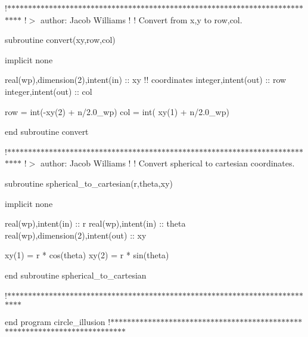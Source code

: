  !$\ast$$\ast$$\ast$$\ast$$\ast$$\ast$$\ast$$\ast$$\ast$$\ast$$\ast$$\ast$$\ast$$\ast$$\ast$$\ast$$\ast$$\ast$$\ast$$\ast$$\ast$$\ast$$\ast$$\ast$$\ast$$\ast$$\ast$$\ast$$\ast$$\ast$$\ast$$\ast$$\ast$$\ast$$\ast$$\ast$$\ast$$\ast$$\ast$$\ast$$\ast$$\ast$$\ast$$\ast$$\ast$$\ast$$\ast$$\ast$$\ast$$\ast$$\ast$$\ast$$\ast$$\ast$$\ast$$\ast$$\ast$$\ast$$\ast$$\ast$$\ast$$\ast$$\ast$$\ast$$\ast$$\ast$$\ast$$\ast$$\ast$$\ast$$\ast$$\ast$$\ast$$\ast$$\ast$ !$>$ author\+: Jacob Williams ! ! Convert from x,y to row,col. \begin{DoxyVerb}subroutine convert(xy,row,col)

implicit none

real(wp),dimension(2),intent(in) :: xy  !! coordinates
integer,intent(out) :: row
integer,intent(out) :: col

row = int(-xy(2) + n/2.0_wp)
col = int( xy(1) + n/2.0_wp)

end subroutine convert
\end{DoxyVerb}
 !$\ast$$\ast$$\ast$$\ast$$\ast$$\ast$$\ast$$\ast$$\ast$$\ast$$\ast$$\ast$$\ast$$\ast$$\ast$$\ast$$\ast$$\ast$$\ast$$\ast$$\ast$$\ast$$\ast$$\ast$$\ast$$\ast$$\ast$$\ast$$\ast$$\ast$$\ast$$\ast$$\ast$$\ast$$\ast$$\ast$$\ast$$\ast$$\ast$$\ast$$\ast$$\ast$$\ast$$\ast$$\ast$$\ast$$\ast$$\ast$$\ast$$\ast$$\ast$$\ast$$\ast$$\ast$$\ast$$\ast$$\ast$$\ast$$\ast$$\ast$$\ast$$\ast$$\ast$$\ast$$\ast$$\ast$$\ast$$\ast$$\ast$$\ast$$\ast$$\ast$$\ast$$\ast$$\ast$ !$>$ author\+: Jacob Williams ! ! Convert spherical to cartesian coordinates. \begin{DoxyVerb}subroutine spherical_to_cartesian(r,theta,xy)

implicit none

real(wp),intent(in) :: r
real(wp),intent(in) :: theta
real(wp),dimension(2),intent(out) :: xy

xy(1) = r * cos(theta)
xy(2) = r * sin(theta)

end subroutine spherical_to_cartesian
\end{DoxyVerb}
 !$\ast$$\ast$$\ast$$\ast$$\ast$$\ast$$\ast$$\ast$$\ast$$\ast$$\ast$$\ast$$\ast$$\ast$$\ast$$\ast$$\ast$$\ast$$\ast$$\ast$$\ast$$\ast$$\ast$$\ast$$\ast$$\ast$$\ast$$\ast$$\ast$$\ast$$\ast$$\ast$$\ast$$\ast$$\ast$$\ast$$\ast$$\ast$$\ast$$\ast$$\ast$$\ast$$\ast$$\ast$$\ast$$\ast$$\ast$$\ast$$\ast$$\ast$$\ast$$\ast$$\ast$$\ast$$\ast$$\ast$$\ast$$\ast$$\ast$$\ast$$\ast$$\ast$$\ast$$\ast$$\ast$$\ast$$\ast$$\ast$$\ast$$\ast$$\ast$$\ast$$\ast$$\ast$$\ast$

end program circle\+\_\+illusion !$\ast$$\ast$$\ast$$\ast$$\ast$$\ast$$\ast$$\ast$$\ast$$\ast$$\ast$$\ast$$\ast$$\ast$$\ast$$\ast$$\ast$$\ast$$\ast$$\ast$$\ast$$\ast$$\ast$$\ast$$\ast$$\ast$$\ast$$\ast$$\ast$$\ast$$\ast$$\ast$$\ast$$\ast$$\ast$$\ast$$\ast$$\ast$$\ast$$\ast$$\ast$$\ast$$\ast$$\ast$$\ast$$\ast$$\ast$$\ast$$\ast$$\ast$$\ast$$\ast$$\ast$$\ast$$\ast$$\ast$$\ast$$\ast$$\ast$$\ast$$\ast$$\ast$$\ast$$\ast$$\ast$$\ast$$\ast$$\ast$$\ast$$\ast$$\ast$$\ast$$\ast$$\ast$$\ast$


